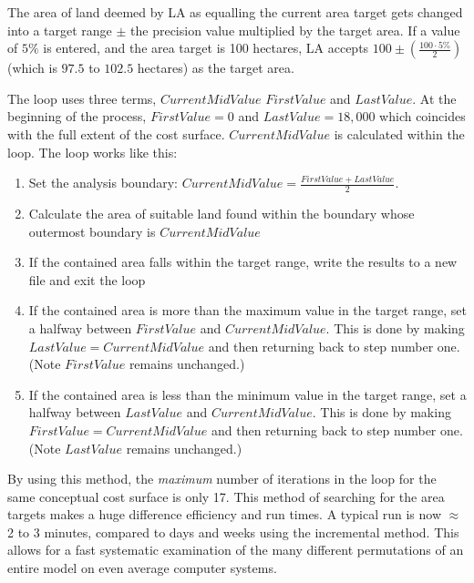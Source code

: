 The area of land deemed by LA as equalling the current area target gets changed into a target range $\pm$ the precision value multiplied by the target area. If a value of $5\%$ is entered, and the area target is 100 hectares, LA accepts $100 \pm(\frac{100 \cdot 5\%}{2})$ (which is $97.5$ to $102.5$ hectares) as the target area.

The loop uses three terms, $CurrentMidValue$ $FirstValue$ and $LastValue$. At the beginning of the process, $FirstValue=0$ and $LastValue=18,000$ which coincides with the full extent of the cost surface. $CurrentMidValue$ is calculated within the loop. The loop works like this: 
\begin{enumerate}
	\item Set the analysis boundary: $CurrentMidValue=\frac{FirstValue + LastValue}{2}$. 
	\item Calculate the area of suitable land found within the boundary whose outermost boundary is $CurrentMidValue$ 
	\item If the contained area falls within the target range, write the results to a new file and exit the loop 
	\item If the contained area is more than the maximum value in the target range, set a halfway between $FirstValue$ and $CurrentMidValue$. This is done by making $LastValue=CurrentMidValue$ and then returning back to step number one. (Note $FirstValue$ remains unchanged.) 
	\item If the contained area is less than the minimum value in the target range, set a halfway between $LastValue$ and $CurrentMidValue$. This is done by making $FirstValue=CurrentMidValue$ and then returning back to step number one. (Note $LastValue$ remains unchanged.) 
\end{enumerate}
By using this method, the \textit{maximum} number of iterations in the loop for the same conceptual cost surface is only 17. This method of searching for the area targets makes a huge difference efficiency and run times. A typical run is now $\approx$ 2 to 3 minutes, compared to days and weeks using the incremental method. This allows for a fast systematic examination of the many different permutations of an entire model on even average computer systems.

%
%
%
%
%
%

